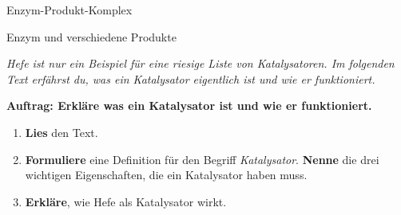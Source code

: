 \documentclass{scrartcl}  %
\begin{document}
				\begin{minipage}[t]{0.2\textwidth}
					{\selectfont  %
						\begin{tcolorbox}[enhanced,
							colback=white,
							colframe=teal,
							fonttitle=\sffamily\bfseries\large, 
							attach boxed title to top left={xshift=3.2mm,yshift=-0.50mm},
							boxed title style={skin=enhancedfirst jigsaw,size=small,arc=1mm,bottom=-1mm,colframe=teal,height=0.6cm},
							colbacktitle=teal,
							drop lifted shadow]
							
							\begin{center}
								Enzym-Produkt-Komplex
							\end{center}
						\end{tcolorbox}
					}  %
				\end{minipage}
				\begin{minipage}[t]{0.2\textwidth}
					{\selectfont  %
						\begin{tcolorbox}[enhanced,
							colback=white,
							colframe=teal,
							fonttitle=\sffamily\bfseries\large, 
							attach boxed title to top left={xshift=3.2mm,yshift=-0.50mm},
							boxed title style={skin=enhancedfirst jigsaw,size=small,arc=1mm,bottom=-1mm,colframe=teal,height=0.6cm},
							colbacktitle=teal,
							drop lifted shadow]
							
							\begin{center}
								Enzym und verschiedene Produkte
							\end{center}
						\end{tcolorbox}
					}  %
				\end{minipage}
		\newpage  %
				\noindent \textit{Hefe ist nur ein Beispiel für eine riesige Liste von Katalysatoren. Im folgenden Text erfährst du, was ein Katalysator eigentlich ist und wie er funktioniert.} \newline
				
				\noindent \textbf{Auftrag: Erkläre was ein Katalysator ist und wie er funktioniert.}
				\begin{enumerate}
					\item \textbf{Lies} den Text.
					\item \textbf{Formuliere} eine Definition für den Begriff \textit{Katalysator}. \textbf{Nenne} die drei wichtigen Eigenschaften, die ein Katalysator haben muss.
					\item \textbf{Erkläre}, wie Hefe als Katalysator wirkt.
				\end{enumerate}
				
\end{document}
